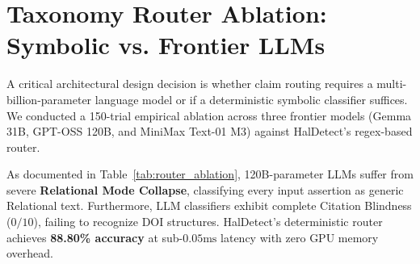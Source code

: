 \section{Taxonomy Router Ablation: Symbolic vs. Frontier LLMs}
\label{sec:router_ablation}

A critical architectural design decision is whether claim routing requires a multi-billion-parameter language model or if a deterministic symbolic classifier suffices. We conducted a 150-trial empirical ablation across three frontier models (Gemma 31B, GPT-OSS 120B, and MiniMax Text-01 M3) against HalDetect's regex-based router.

\begin{table}[htbp]
\centering
\small
\caption{Classification accuracy, latency, and mode collapse across taxonomy routing architectures ($N = 150$ randomized claims).}
\label{tab:router_ablation}
\end{table}

As documented in Table~\ref{tab:router_ablation}, 120B-parameter LLMs suffer from severe \textbf{Relational Mode Collapse}, classifying every input assertion as generic Relational text. Furthermore, LLM classifiers exhibit complete Citation Blindness ($0/10$), failing to recognize DOI structures. HalDetect's deterministic router achieves \textbf{88.80\% accuracy} at sub-$0.05\text{ms}$ latency with zero GPU memory overhead.

